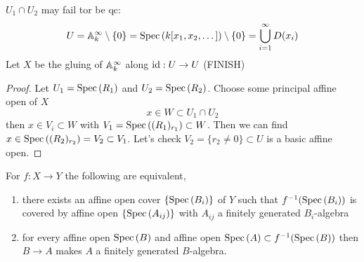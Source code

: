 \documentclass[12pt]{article}
\begin{document}
\begin{rmk}
$U_1 \cap U_2$ may fail tor be qc: 
\[ U = \mathbb{A}_k^\infty \setminus \{ 0 \} = \mathrm{Spec}\left( k[x_1, x_2, \dots] \right) \setminus \{ 0 \} = \bigcup_{i = 1}^\infty D(x_i) \]
Let $X$ be the gluing of $\mathbb{A}^\infty_k$ along $\mathrm{id} : U \to U$ (FINISH)
\end{rmk}

\begin{proof}
Let $U_1 = \mathrm{Spec}\left( R_1 \right)$ and $U_2 = \mathrm{Spec}\left( R_2 \right)$. 
Choose some principal affine open of $X$
\[ x \in W \subset U_1 \cap U_2 \]
then $x \in V_i \subset W$ with $V_1 = \mathrm{Spec}\left( (R_1)_{r_1} \right) \subset W$. Then we can find $x \in \mathrm{Spec}\left( (R_2)_{r_2} \right) = V_2 \subset V_1$. Let's check $V_2 = \{ r_2 \neq 0 \} \subset U$ is a basic affine open.
\end{proof}

\begin{thm}
For $f : X \to Y$ the following are equivalent,
\begin{enumerate}
\item there exists an affine open cover $\{ \mathrm{Spec}\left( B_i \right) \}$ of $Y$ such that $f^{-1}(\mathrm{Spec}\left( B_i \right))$ is covered by affine open $\{ \mathrm{Spec}\left( A_{ij} \right) \}$ with $A_{ij}$ a finitely generated $B_i$-algebra
\item for every affine open $\mathrm{Spec}\left( B \right)$ and affine open $\mathrm{Spec}\left( A \right) \subset f^{-1}(\mathrm{Spec}\left( B \right))$ then $B \to A$ makes $A$ a finitely generated $B$-algebra.
\end{enumerate}
\end{thm}
\end{document}
